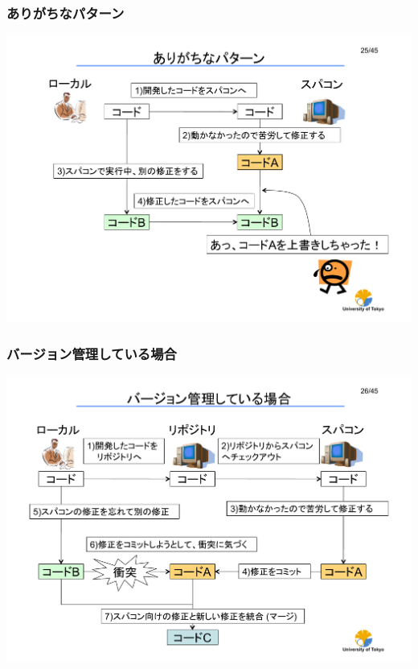 \begin{frame}
  \frametitle{ありがちなパターン}
  \begin{center}
    \includegraphics[height=0.88\textheight]{pattern-1.pdf}
  \end{center}
\end{frame}

\begin{frame}
  \frametitle{バージョン管理している場合}
  \begin{center}
    \includegraphics[height=0.78\textheight]{pattern-2.pdf}
  \end{center}
\end{frame}

